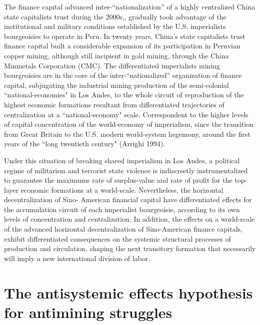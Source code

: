 \documentclass[]{interact}
\theoremstyle{plain}%
\theoremstyle{definition}
\theoremstyle{remark}
\begin{document}
The finance capital advanced inter-“nationalization” of a highly centralized China state capitalists trust during the 2000s,, gradually took advantage of the institutional and military conditions established by the U.S. imperialists bourgeoisies to operate in Peru. In twenty years, China's state capitalists trust finance capital built a considerable expansion of its participation in Peruvian copper mining, although still incipient in gold mining, through the China Minmetals Corporation (CMC). The differentiated imperialists mining bourgeoisies are in the core of the inter-“nationalized” organization of finance capital, subjugating the industrial mining production of the semi-colonial “national-economies" in Los Andes, to the whole circuit of reproduction of the highest economic formations resultant from differentiated trajectories of centralization at a “national-economy" scale. Correspondent to the higher levels of capital concentration of the world-economy of imperialism, since the transition from Great Britain to the U.S. modern world-system hegemony, around the first years of the “long twentieth century" (Arrighi 1994).

Under this situation of breaking shared imperialism in Los Andes, a political regime of militarism and terrorist state violence is indiscreetly instrumentalized to guarantee the maximums rate of surplus-value and rate of profit for the top-layer economic formations at a world-scale. Nevertheless, the horizontal decentralization of Sino- American financial capital have differentiated effects for the accumulation circuit of each imperialist bourgeoisie, according to its own levels of concentration and centralization. In addition, the effects on a world-scale of the advanced horizontal decentralization of Sino-American finance capitals, exhibit differentiated consequences on the systemic structural processes of production and circulation, shaping the next transitory formation that necessarily will imply a new international division of labor.

\section{The antisystemic effects hypothesis for antimining struggles}
\end{document}
